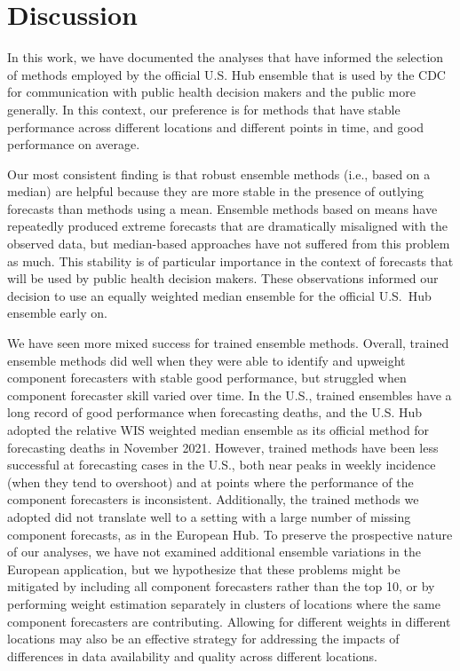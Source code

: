 \documentclass[11pt,3p,authoryear]{elsarticle}
\begin{document}
\section{Discussion}

In this work, we have documented the analyses that have informed the selection of methods employed by the official U.S. Hub ensemble that is used by the CDC for communication with public health decision makers and the public more generally. In this context, our preference is for methods that have stable performance across different locations and different points in time, and good performance on average.

Our most consistent finding is that robust ensemble methods (i.e., based on a median) are helpful because they are more stable in the presence of outlying forecasts than methods using a mean. Ensemble methods based on means have repeatedly produced extreme forecasts that are dramatically misaligned with the observed data, but median-based approaches have not suffered from this problem as much. This stability is of particular importance in the context of forecasts that will be used by public health decision makers. These observations informed our decision to use an equally weighted median ensemble for the official U.S.\ Hub ensemble early on.

We have seen more mixed success for trained ensemble methods.
Overall, trained ensemble methods did well when they were able to identify and upweight component forecasters with stable good performance, but struggled when component forecaster skill varied over time.
In the U.S., trained ensembles have a long record of good performance when forecasting deaths, and the U.S. Hub adopted the relative WIS weighted median ensemble as its official method for forecasting deaths in November 2021.
However, trained methods have been less successful at forecasting cases in the U.S., both near peaks in weekly incidence (when they tend to overshoot) and at points where the performance of the component forecasters is inconsistent.
Additionally, the trained methods we adopted did not translate well to a setting with a large number of missing component forecasts, as in the European Hub.
To preserve the prospective nature of our analyses, we have not examined additional ensemble variations in the European application, but we hypothesize that these problems might be mitigated by including all component forecasters rather than the top 10, or by performing weight estimation separately in clusters of locations where the same component forecasters are contributing.
Allowing for different weights in different locations may also be an effective strategy for addressing the impacts of differences in data availability and quality across different locations.
\end{document}
